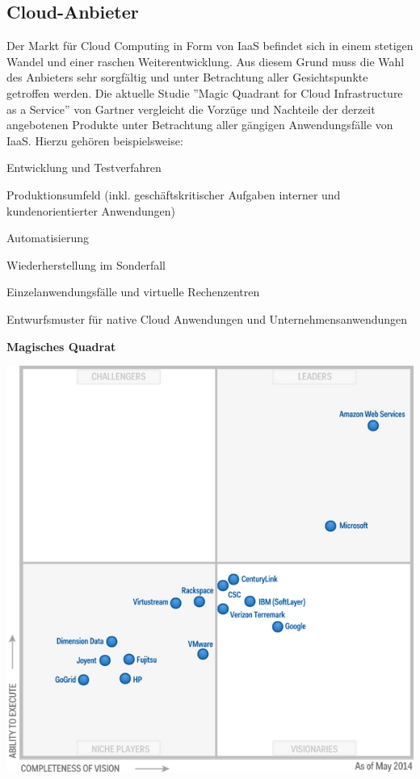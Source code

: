 \documentclass[12pt,a4paper,bibliography=totocnumbered,listof=totocnumbered]{scrartcl}
\begin{document}
\subsection{Cloud-Anbieter}
Der Markt für Cloud Computing in Form von IaaS befindet sich in einem stetigen Wandel und einer raschen Weiterentwicklung. Aus diesem Grund muss die Wahl des Anbieters sehr sorgfältig und unter Betrachtung aller Gesichtspunkte getroffen werden. Die aktuelle Studie ''Magic Quadrant for Cloud Infrastructure as a Service'' von Gartner \cite{30} vergleicht die Vorzüge und Nachteile der derzeit angebotenen Produkte unter Betrachtung aller gängigen Anwendungsfälle von IaaS. Hierzu gehören beispielsweise:
\begin{compactitem}
	\item Entwicklung und Testverfahren
	\item Produktionsumfeld (inkl. geschäftskritischer Aufgaben interner und kundenorientierter Anwendungen)
	\item Automatisierung
	\item Wiederherstellung im Sonderfall
	\item Einzelanwendungsfälle und virtuelle Rechenzentren
	\item Entwurfsmuster für native Cloud Anwendungen und Unternehmensanwendungen
\end{compactitem}
\pagebreak

\textbf{Magisches Quadrat}
\vspace{1em}
$\;$\\
\begin{minipage}{\linewidth}
	\centering
	\includegraphics[width=0.7\linewidth]{./img/Gartner_Magic_Square.png}
	\label{Gartner}
\end{minipage}
\vspace{1em}
\end{document}
